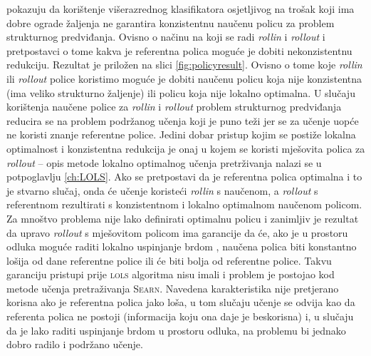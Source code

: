 \cite{daume15lols} pokazuju da korištenje višerazrednog klasifikatora
osjetljivog na trošak koji ima dobre ograde žaljenja ne garantira konzistentnu
naučenu policu za problem strukturnog predviđanja. Ovisno o načinu na koji se
radi \textit{rollin} i \textit{rollout} i pretpostavci o tome kakva je
referentna polica moguće je dobiti nekonzistentnu redukciju. Rezultat je
priložen na slici \ref{fig:policyresult}. Ovisno o tome koje \textit{rollin} ili
\textit{rollout} police koristimo moguće je dobiti naučenu policu koja nije
konzistentna (ima veliko strukturno žaljenje) ili policu koja nije lokalno
optimalna. U slučaju korištenja naučene police za \textit{rollin} i
\textit{rollout} problem strukturnog predviđanja reducira se na problem
podržanog učenja koji je puno teži jer se za učenje uopće ne koristi znanje
referentne police. Jedini dobar pristup kojim se postiže lokalna optimalnost i
konzistentna redukcija je onaj u kojem se koristi mješovita polica za
\textit{rollout} -- opis metode lokalno optimalnog učenja pretrživanja nalazi se
u potpoglavlju \ref{ch:LOLS}. Ako se pretpostavi da je referentna polica
optimalna i to je stvarno slučaj, onda će učenje koristeći \textit{rollin} s
naučenom, a \textit{rollout} s referentnom rezultirati s konzistentnom i lokalno
optimalnom naučenom policom. Za mnoštvo problema nije lako definirati optimalnu
policu i zanimljiv je rezultat da upravo \textit{rollout} s mješovitom policom
ima garancije da će, ako je u prostoru odluka moguće raditi lokalno uspinjanje
brdom , naučena polica biti konstantno lošija od dane
referentne police ili će biti bolja od referentne police. Takvu garanciju
pristupi prije \textsc{lols} algoritma nisu imali i problem je postojao kod
metode učenja pretraživanja \textsc{Searn}. Navedena karakteristika nije
pretjerano korisna ako je referentna polica jako loša, u tom slučaju učenje se
odvija kao da referenta polica ne postoji (informacija koju ona daje je
beskorisna) i, u slučaju da je lako raditi uspinjanje brdom u prostoru odluka,
na problemu bi jednako dobro radilo i podržano učenje.

